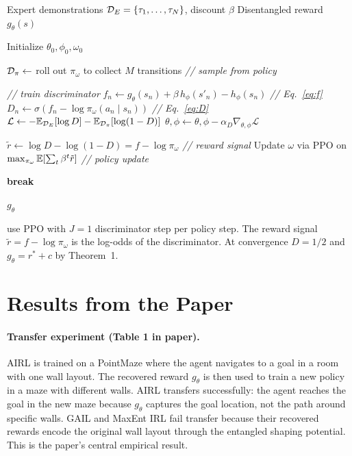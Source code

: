 \documentclass[11pt]{article}
\newcommand{\calL}{\mathcal{L}}
\begin{document}
\begin{algorithm}[h!]
\caption{AIRL (Fu et al.\ 2018, Algorithm 1)}
\label{alg:airl}
\begin{algorithmic}[1]
\REQUIRE Expert demonstrations $\mathcal{D}_E = \{\tau_1, \ldots, \tau_N\}$, discount $\beta$
\ENSURE Disentangled reward $g_\theta(s)$

\STATE Initialize $\theta_0, \phi_0, \omega_0$


\STATE $\mathcal{D}_\pi \leftarrow$ roll out $\pi_\omega$ to collect $M$ transitions \hfill \textit{// sample from policy}

 \hfill \textit{// train discriminator}
  \STATE $f_n \leftarrow g_\theta(s_n) + \beta\, h_\phi(s'_n) - h_\phi(s_n)$ \hfill \textit{// Eq.~\eqref{eq:f}}
  \STATE $D_n \leftarrow \sigma(f_n - \log \pi_\omega(a_n \mid s_n))$ \hfill \textit{// Eq.~\eqref{eq:D}}
  \STATE $\calL \leftarrow -\E_{\calD_E}[\log D] - \E_{\calD_\pi}[\log(1-D)]$
  \STATE $\theta, \phi \leftarrow \theta, \phi - \alpha_D \nabla_{\theta,\phi} \calL$
\ENDFOR

\STATE $\tilde{r} \leftarrow \log D - \log(1-D) = f - \log \pi_\omega$ \hfill \textit{// reward signal}
\STATE Update $\omega$ via PPO on $\max_{\pi_\omega} \mathbb{E}[\sum_t \beta^t \tilde{r}]$ \hfill \textit{// policy update}

  \STATE \textbf{break}
\ENDIF

\ENDFOR
\RETURN $g_\theta$ 
\end{algorithmic}
\end{algorithm}
\FloatBarrier

\citet{fu2018} use PPO \citep{schulman2017} with $J = 1$ discriminator step per policy step.
The reward signal $\tilde{r} = f - \log \pi_\omega$ is the log-odds of the discriminator.
At convergence $D = 1/2$ and $g_\theta = r^* + c$ by Theorem~1.

\section{Results from the Paper}

\paragraph{Transfer experiment (Table 1 in paper).}
AIRL is trained on a PointMaze where the agent navigates to a goal in a room with one wall layout.
The recovered reward $g_\theta$ is then used to train a new policy in a maze with different walls.
AIRL transfers successfully: the agent reaches the goal in the new maze because $g_\theta$ captures the goal location, not the path around specific walls.
GAIL and MaxEnt IRL fail transfer because their recovered rewards encode the original wall layout through the entangled shaping potential.
This is the paper's central empirical result.
\end{document}
